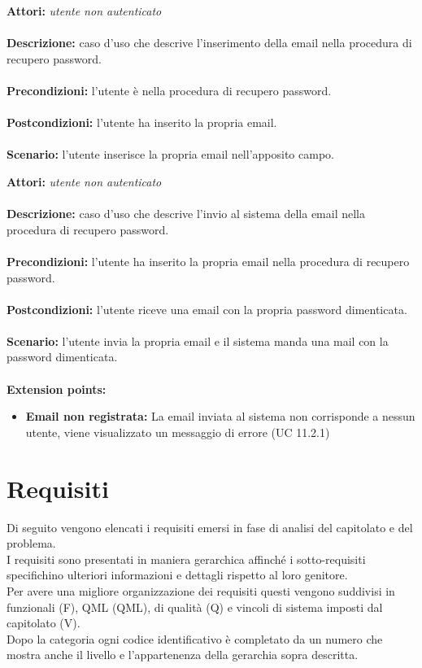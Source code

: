 \documentclass[a4paper,11pt]{article}
\begin{document}

\textbf{Attori:} \textit{utente non autenticato}
\\ \\
\textbf{Descrizione:} caso d'uso che descrive l'inserimento della email nella procedura di recupero password.\\
\\
\textbf{Precondizioni:} l'utente è nella procedura di recupero password.\\
\\
\textbf{Postcondizioni:} l’utente ha inserito la propria email.\\
\\
\textbf{Scenario:} l’utente inserisce la propria email nell'apposito campo.\\



\textbf{Attori:} \textit{utente non autenticato}
\\ \\
\textbf{Descrizione:} caso d'uso che descrive l'invio al sistema della email nella procedura di recupero password.\\
\\
\textbf{Precondizioni:} l'utente ha inserito la propria email nella procedura di recupero password.\\
\\
\textbf{Postcondizioni:} l’utente riceve una email con la propria password dimenticata.\\
\\
\textbf{Scenario:} l’utente invia la propria email e il sistema manda una mail con la password dimenticata.\\
\\
\textbf{Extension points:} 
\begin{itemize}
	\item \textbf{Email non registrata:} La email inviata al sistema non corrisponde a nessun utente, viene visualizzato un messaggio di errore (UC 11.2.1)
\end{itemize}
	\newpage

\section{Requisiti}
		Di seguito vengono elencati i requisiti emersi in fase di analisi del capitolato e del problema.\\
		I requisiti sono presentati in maniera gerarchica affinché i sotto-requisiti specifichino ulteriori informazioni e dettagli rispetto al loro genitore.\\
		Per avere una migliore organizzazione dei requisiti questi vengono suddivisi in funzionali (F), QML (QML), di qualità (Q) e vincoli di sistema imposti dal capitolato (V).\\
		Dopo la categoria ogni codice identificativo è completato da un numero che mostra anche il livello e l'appartenenza della gerarchia sopra descritta.\\
\end{document}
